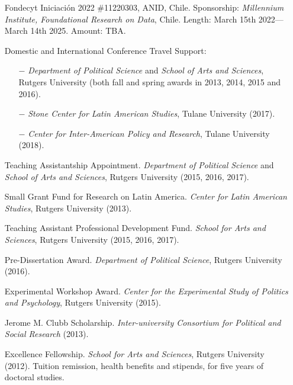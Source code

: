 \begin{itemize}

	\item[\textcolor{gray}{\textbullet}] Fondecyt Iniciaci\'on 2022 \#11220303, ANID, Chile. Sponsorship: \emph{Millennium Institute, Foundational Research on Data}, Chile. Length: March 15th 2022---March 14th 2025. Amount: TBA.

	
	\item[\textcolor{gray}{\textbullet}] Domestic and International Conference Travel Support: 
		\begin{itemize}
			
			\item[$-$] \emph{Department of Political Science} and \emph{School of Arts and Sciences}, Rutgers University (both fall and spring awards in 2013, 2014, 2015 and 2016).
			
			\item[$-$] \emph{Stone Center for Latin American Studies}, Tulane University (2017).

			\item[$-$] \emph{Center for Inter-American Policy and Research}, Tulane University (2018).
		\end{itemize}
	
	\item[\textcolor{gray}{\textbullet}] Teaching Assistantship Appointment. \emph{Department of Political Science} and \emph{School of Arts and Sciences}, Rutgers University (2015, 2016, 2017).
	
	\item[\textcolor{gray}{\textbullet}] Small Grant Fund for Research on Latin America. \emph{Center for Latin American Studies}, Rutgers University (2013).
	
	\item[\textcolor{gray}{\textbullet}] Teaching Assistant Professional Development Fund. \emph{School for Arts and Sciences}, Rutgers University (2015, 2016, 2017).
	
	\item[\textcolor{gray}{\textbullet}] Pre-Dissertation Award. \emph{Department of Political Science}, Rutgers University (2016).
	
	\item[\textcolor{gray}{\textbullet}] Experimental Workshop Award. \emph{Center for the Experimental Study of Politics and Psychology}, Rutgers University (2015).
	
	\item[\textcolor{gray}{\textbullet}] Jerome M. Clubb Scholarship. \emph{Inter-university Consortium for Political and Social Research} (2013).
	
	\item[\textcolor{gray}{\textbullet}] Excellence Fellowship. \emph{School for Arts and Sciences}, Rutgers University (2012). Tuition remission, health benefits and stipends, for five years of doctoral studies.
\end{itemize}